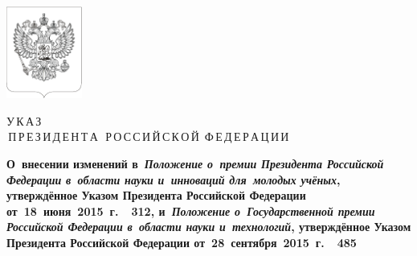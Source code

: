 \documentclass[12pt, a4paper]{extarticle}
\begin{document}
\begin{center}
	\thispagestyle{firststyle}

	\setBold[.5]
	
	\vspace*{-1cm}
	\includegraphics[width=2.5cm]{./emblem_black_bordered} \medskip
	
	\huge{У}\Large{\,К\,А\,З} \\\medskip
	\Large{\,П}\normalsize \,Р\,Е\,З\,И\,Д\,Е\,Н\,Т\,А\, 
	\Large{\,Р}\normalsize \,О\,С\,С\,И\,Й\,С\,К\,О\,Й 
	\Large{\,Ф}\normalsize \,Е\,Д\,Е\,Р\,А\,Ц\,И\,И 
	\bigskip
	\unsetBold
	
	\begin{minipage}{.95\textwidth}
		\bfseries
		\centering\normalsize
		О~внесении изменений в~\emph{Положение о~премии Президента Российской Федерации в~области науки и~инноваций для~молодых учёных}, утверждённое Указом Президента Российской Федерации от~18~июня~2015~г.~\textnumero~312, и~\emph{Положение о~Государственной премии Российской Федерации в~области науки и~технологий}, утверждённое Указом Президента Российской Федерации от~28~сентября~2015~г.~\textnumero~485
		\unsetBold
	\end{minipage}
	\bigskip
	
\end{center}
\end{document}
